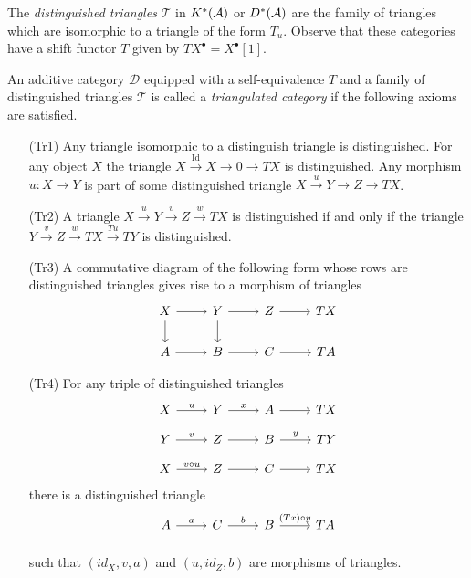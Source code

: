 The {\it distinguished triangles} $\mathcal{T}$ in $K^*(\AA)$ or $D^*(\AA)$ are the family of triangles which are isomorphic to a triangle of the form $T_u$.
Observe that these categories have a shift functor $T$ given by $TX^\bullet = X^\bullet[1]$.
\begin{definition}
 An additive category $\mathcal{D}$ equipped with a self-equivalence $T$ and a family of distinguished triangles $\mathcal{T}$ is called a {\it triangulated category} if the following axioms are satisfied.
 \begin{enumerate}
   \item[(Tr1)] Any triangle isomorphic to a distinguish triangle is distinguished. For any object $X$ the triangle $X\xrightarrow{\operatorname{Id}} X \to 0 \to TX$ is distinguished.
   Any morphism $u:X\to Y$ is part of some distinguished triangle $X\xrightarrow{u} Y \to Z \to TX$.
   \item[(Tr2)] A triangle $X\xrightarrow{u} Y \xrightarrow{v} Z \xrightarrow{w} TX$ is distinguished if and only if the triangle $Y \xrightarrow{v} Z \xrightarrow{w} TX \xrightarrow{Tu} TY$ is distinguished.
   \item[(Tr3)] A commutative diagram of the following form whose rows are distinguished triangles gives rise to a morphism of triangles
   $$
     \begin{tikzcd}
       X\arrow{d}\rar& Y\arrow{d}\rar & Z\rar & TX\\
       A\rar& B\rar & C\rar & TA
     \end{tikzcd}
    $$
   \item[(Tr4)] For any triple of distinguished triangles
   $$
     \begin{tikzcd}[row sep=small]
       X \arrow{r}{u} & Y \arrow{r}{x}& A \arrow{r}{} & TX \\
       Y \arrow{r}{v} & Z \arrow{r}{}& B \arrow{r}{y} & TY\\
       X \arrow{r}{v\circ u} & Z\arrow{r}{} & C\arrow{r}{} & TX
     \end{tikzcd}
   $$
   there is a distinguished triangle
   $$\begin{tikzcd}[row sep=small]
     A \arrow{r}{a} & C \arrow{r}{b}& B \arrow{r}{(Tx)\circ y} & TA \\
   \end{tikzcd} $$
   such that $(id_X, v,a)$ and $(u,id_Z,b)$ are morphisms of triangles.
   \end{enumerate}
\end{definition}

